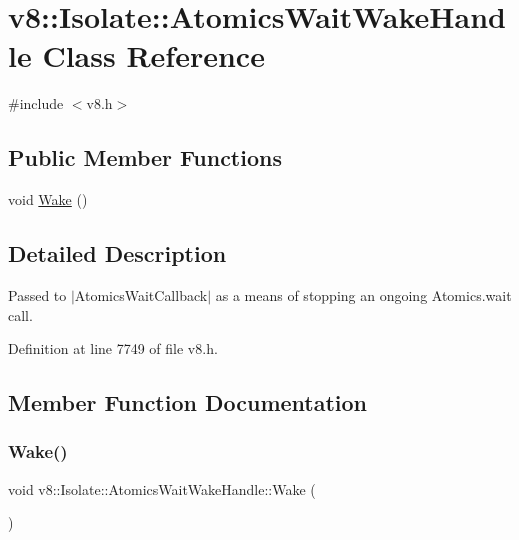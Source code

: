 \hypertarget{classv8_1_1Isolate_1_1AtomicsWaitWakeHandle}{}\section{v8\+:\+:Isolate\+:\+:Atomics\+Wait\+Wake\+Handle Class Reference}
\label{classv8_1_1Isolate_1_1AtomicsWaitWakeHandle}


{\ttfamily \#include $<$v8.\+h$>$}

\subsection*{Public Member Functions}
\begin{DoxyCompactItemize}
\item 
void \mbox{\hyperlink{classv8_1_1Isolate_1_1AtomicsWaitWakeHandle_a3d31d451537b6eee01e71360f7e66c2e}{Wake}} ()
\end{DoxyCompactItemize}


\subsection{Detailed Description}
Passed to $\vert$\+Atomics\+Wait\+Callback$\vert$ as a means of stopping an ongoing {\ttfamily Atomics.\+wait} call. 

Definition at line 7749 of file v8.\+h.



\subsection{Member Function Documentation}
\mbox{\label{classv8_1_1Isolate_1_1AtomicsWaitWakeHandle_a3d31d451537b6eee01e71360f7e66c2e}} 
\subsubsection{\texorpdfstring{Wake()}{Wake()}}
{\footnotesize\ttfamily void v8\+::\+Isolate\+::\+Atomics\+Wait\+Wake\+Handle\+::\+Wake (\begin{DoxyParamCaption}{ }\end{DoxyParamCaption})}

